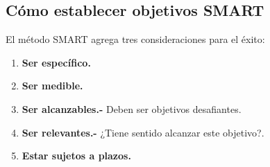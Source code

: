 \documentclass[10pt]{book}
\begin{document}
    \subsection{Cómo establecer objetivos SMART}
    El método SMART agrega tres consideraciones para el éxito:
    \begin{enumerate}[\bfseries 1.]
	\item \textbf{Ser específico.}
	\item \textbf{Ser medible.}
	\item \textbf{Ser alcanzables.-} Deben ser objetivos desafiantes.
	\item \textbf{Ser relevantes.-} ¿Tiene sentido alcanzar este objetivo?.
	\item \textbf{Estar sujetos a plazos.}\\\\
    \end{enumerate}
\end{document}
